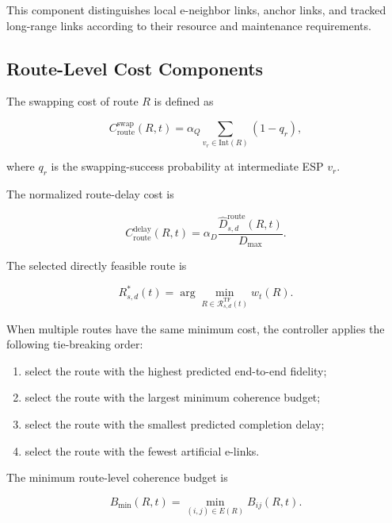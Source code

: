 This component distinguishes local e-neighbor links, anchor links, and tracked long-range links according to their resource and maintenance requirements.

\subsection{Route-Level Cost Components}

The swapping cost of route $R$ is defined as

\begin{equation}
    C_{\mathrm{route}}^{\mathrm{swap}}(R,t)
    =
    \alpha_Q
    \sum_{
    v_r
    \in
    \mathrm{Int}(R)
    }
    \left(
    1-q_r
    \right),
\end{equation}

where $q_r$ is the swapping-success probability at intermediate ESP $v_r$.

The normalized route-delay cost is

\begin{equation}
    C_{\mathrm{route}}^{\mathrm{delay}}(R,t)
    =
    \alpha_D
    \frac{
    \widehat{D}_{s,d}^{\mathrm{route}}(R,t)
    }{
    D_{\max}
    }.
\end{equation}

The selected directly feasible route is

\begin{equation}
    R_{s,d}^{*}(t)
    =
    \arg\min_{
    R
    \in
    \mathcal{R}_{s,d}^{\mathrm{TF}}(t)
    }
    w_t(R).
\end{equation}

When multiple routes have the same minimum cost, the controller applies the following tie-breaking order:

\begin{enumerate}
    \item select the route with the highest predicted end-to-end fidelity;
    \item select the route with the largest minimum coherence budget;
    \item select the route with the smallest predicted completion delay;
    \item select the route with the fewest artificial e-links.
\end{enumerate}

The minimum route-level coherence budget is

\begin{equation}
    B_{\min}(R,t)
    =
    \min_{
    (i,j)
    \in
    E(R)
    }
    B_{ij}(R,t).
\end{equation}

